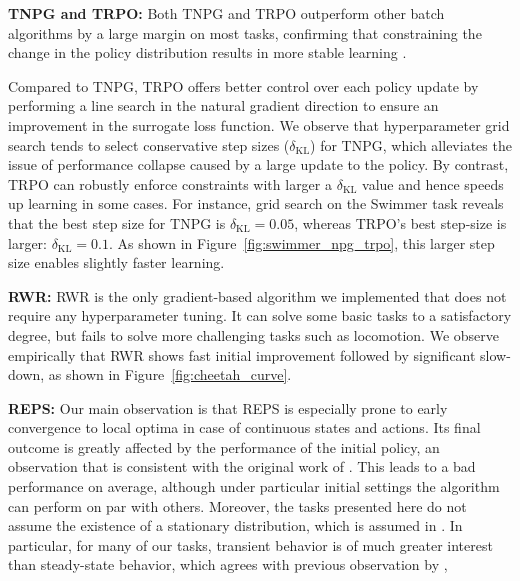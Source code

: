 \documentclass{article}
\begin{document}
{\bf TNPG and TRPO:} Both TNPG and TRPO outperform other batch algorithms by a large margin on most tasks, confirming that constraining the change in the policy distribution results in more stable learning \cite{peters2008reinforcement}.



Compared to TNPG, TRPO offers better control over each policy update by performing a line search in the natural gradient direction to ensure an improvement in the surrogate loss function. We observe that hyperparameter grid search tends to select conservative step sizes ($\delta_{\text{KL}}$) for TNPG, which alleviates the issue of performance collapse caused by a large update to the policy. By contrast, TRPO can robustly enforce constraints with larger a $\delta_{\text{KL}}$ value and hence speeds up learning in some cases. For instance, grid search on the Swimmer task reveals that the best step size for TNPG is $\delta_{\text{KL}} = 0.05$, whereas TRPO's best step-size is larger: $\delta_{\text{KL}} = 0.1$. As shown in Figure~\ref{fig:swimmer_npg_trpo}, this larger step size enables slightly faster learning.







{\bf RWR:} RWR is the only gradient-based algorithm we implemented that does not require any hyperparameter tuning. It can solve some basic tasks to a satisfactory degree, but fails to solve more challenging tasks such as locomotion. We observe empirically that RWR shows fast initial improvement followed by significant slow-down, as shown in Figure~\ref{fig:cheetah_curve}.




{\bf REPS:} Our main observation is that REPS is especially prone to early convergence to local optima in case of continuous states and actions. Its final outcome is greatly affected by the performance of the initial policy, an observation that is consistent with the original work of \citet{Peters10REPS}. This leads to a bad performance on average, although under particular initial settings the algorithm can perform on par with others. Moreover, the tasks presented here do not assume the existence of a stationary distribution, which is assumed in \citet{Peters10REPS}. In particular, for many of our tasks, transient behavior is of much greater interest than steady-state behavior, which agrees with previous observation by \citet{HofNeuPet15}, 
\end{document}
